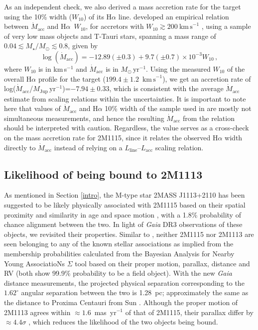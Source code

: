 \documentclass{aa}
\newcommand{\mjyr}{\ensuremath{M_\mathrm{Jup}\,\mathrm{yr^{-1}}}\xspace}
\newcommand{\Msyr}{\ensuremath{M_\odot\,\mathrm{yr^{-1}}}\xspace}
\newcommand{\msun}{\ensuremath{M_\odot}\xspace}
\newcommand{\Mstar}{\ensuremath{M_\star}\xspace}
\newcommand{\Ha}{\ensuremath{\mathrm{H}\alpha}\xspace}
\newcommand{\Lacc}{\ensuremath{L_{\mathrm{acc}}}\xspace}
\newcommand{\mdot}{\ensuremath{\dot{M}_{\mathrm{acc}}}\xspace}
\newcommand{\Lline}{\ensuremath{L_{\mathrm{line}}}\xspace}
\newcommand{\kms}{\ensuremath{\mathrm{km\,s}^{-1}}\xspace}
\begin{document}
As an independent check, we also derived a mass accretion rate for the target using the 10\% width ($W_{10}$) of its \Ha line. \cite{natta2004} developed an empirical relation between \mdot and \Ha~$W_{10}$, for accretors with $W_{10}\gtrsim200~\kms$ \citep{jayawardhana2003}, using a sample of very low mass objects and T-Tauri stars, spanning a mass range of $0.04 \lesssim \Mstar/\msun \lesssim 0.8$, given by
\begin{equation}
    \log(\mdot) = -12.89(\pm0.3) + 9.7(\pm0.7)\times10^{-3} W_{10}\,,
\end{equation}
where $W_{10}$ is in km\,s$^{-1}$ and \mdot is in \Msyr. Using the measured $W_{10}$ of the overall \Ha profile for the target ($199.4\pm1.2$~\kms), we get an accretion rate of log(\mdot/\mjyr)=$-7.94\pm0.33$, which is consistent with the average \mdot estimate from \cite{aoyama2021} scaling relations within the uncertainties. It is important to note here that values of \mdot and \Ha 10\% width of the sample used in \cite{natta2004} are mostly not simultaneous measurements, and hence the resulting \mdot from the relation should be interpreted with caution. Regardless, the value serves as a cross-check on the mass accretion rate for 2M1115, since it relates the observed \Ha width directly to \mdot instead of relying on a \Lline--\Lacc scaling relation.


\subsection{Likelihood of being bound to 2M1113}
As mentioned in Section \ref{intro}, the M-type star 2MASS J1113+2110 has been suggested to be likely physically associated with 2M1115 based on their spatial proximity and similarity in age and space motion \citep{theissen2018}, with a 1.8\% probability of chance alignment between the two. In light of \textit{Gaia} DR3 observations of these objects, we revisited their properties. Similar to \cite{theissen2018}, neither 2M1115 nor 2M1113 are seen belonging to any of the known stellar associations as implied from the membership probabilities calculated from the Bayesian Analysis for Nearby Young AssociatioNs $\Sigma$ \citep[BANYAN $\Sigma$;][]{gagne2018} tool based on their proper motion, parallax, distance and RV (both show 99.9\% probability to be a field object). With the new \textit{Gaia} distance measurements, the projected physical separation corresponding to the $1.62^{\circ}$ angular separation between the two is 1.28~pc; approximately the same as the distance to Proxima Centauri from Sun \citep[1.29 pc; ][]{turbet2016}. Although the proper motion of 2M1113 \citep[$\mu_{\alpha^*}=-68.932\pm0.194$~mas~yr$^{-1}$, $\mu_{\delta}=-21.985\pm0.190$~mas~yr$^{-1}$][]{gaiadr3} agrees within $\approx1.6$~mas~yr$^{-1}$ of that of 2M1115, their parallax differ by $\approx4.4\sigma$ \citep[parallax $=17.34\pm0.25$~mas for 2M1115;][]{theissen2018}, which reduces the likelihood of the two objects being bound. 
\end{document}
